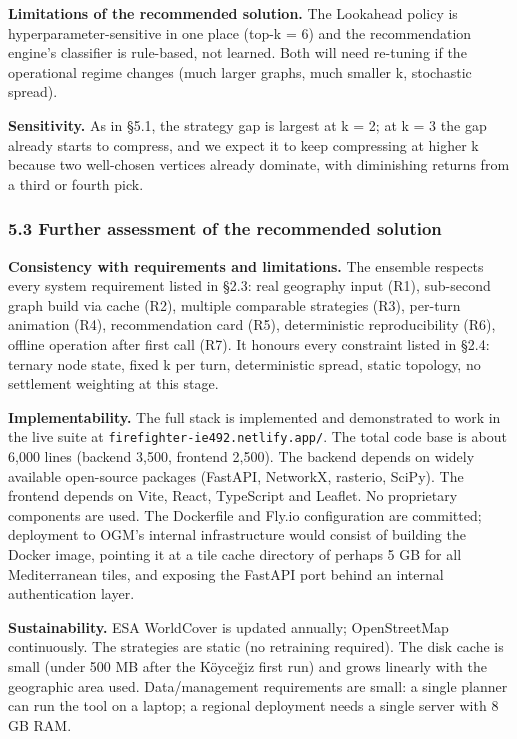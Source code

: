\documentclass[
  11pt,
]{article}
\begin{document}
\textbf{Limitations of the recommended solution.} The Lookahead policy
is hyperparameter-sensitive in one place (top-k = 6) and the
recommendation engine's classifier is rule-based, not learned. Both will
need re-tuning if the operational regime changes (much larger graphs,
much smaller k, stochastic spread).

\textbf{Sensitivity.} As in §5.1, the strategy gap is largest at k = 2;
at k = 3 the gap already starts to compress, and we expect it to keep
compressing at higher k because two well-chosen vertices already
dominate, with diminishing returns from a third or fourth pick.

\subsubsection{5.3 Further assessment of the recommended
solution}\label{further-assessment-of-the-recommended-solution}

\textbf{Consistency with requirements and limitations.} The ensemble
respects every system requirement listed in §2.3: real geography input
(R1), sub-second graph build via cache (R2), multiple comparable
strategies (R3), per-turn animation (R4), recommendation card (R5),
deterministic reproducibility (R6), offline operation after first call
(R7). It honours every constraint listed in §2.4: ternary node state,
fixed k per turn, deterministic spread, static topology, no settlement
weighting at this stage.

\textbf{Implementability.} The full stack is implemented and
demonstrated to work in the live suite at
\texttt{firefighter-ie492.netlify.app/}. The total code base is about
6,000 lines (backend 3,500, frontend 2,500). The backend depends on
widely available open-source packages (FastAPI, NetworkX, rasterio,
SciPy). The frontend depends on Vite, React, TypeScript and Leaflet. No
proprietary components are used. The Dockerfile and Fly.io configuration
are committed; deployment to OGM's internal infrastructure would consist
of building the Docker image, pointing it at a tile cache directory of
perhaps 5 GB for all Mediterranean tiles, and exposing the FastAPI port
behind an internal authentication layer.

\textbf{Sustainability.} ESA WorldCover is updated annually;
OpenStreetMap continuously. The strategies are static (no retraining
required). The disk cache is small (under 500 MB after the Köyceğiz
first run) and grows linearly with the geographic area used.
Data/management requirements are small: a single planner can run the
tool on a laptop; a regional deployment needs a single server with 8 GB
RAM.
\end{document}
